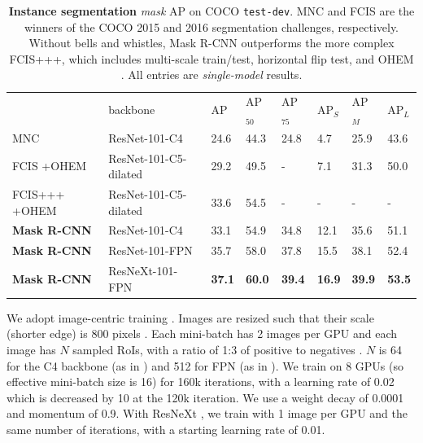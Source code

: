 \documentclass[10pt,twocolumn,letterpaper]{article}
\newcommand{\bd}[1]{\textbf{#1}}
\newcommand{\tablestyle}[2]{\setlength{\tabcolsep}{#1}\renewcommand{\arraystretch}{#2}\centering\footnotesize}
\begin{document}
\begin{table}[t]
\tablestyle{3.5pt}{1.1}
\begin{tabular}{l|l|x{22}x{22}x{22}|x{22}x{22}x{22}}
 & backbone &  AP &  AP$_{50}$ & AP$_{75}$ & AP$_S$ &  AP$_M$ &  AP$_L$\\
\shline
 MNC \cite{Dai2016} & ResNet-101-C4
  & 24.6 & 44.3 & 24.8 & 4.7 & 25.9 & 43.6\\
 FCIS \cite{Li2017} +OHEM & ResNet-101-C5-dilated
  & 29.2 & 49.5 & - & 7.1 & 31.3 & 50.0\\
 FCIS+++ \cite{Li2017} +OHEM & ResNet-101-C5-dilated
  & 33.6 & 54.5 & - & - & - & -\\
\hline
 \bd{Mask R-CNN} & ResNet-101-C4
  & 33.1 & 54.9 & 34.8 & 12.1 & 35.6 & 51.1 \\
 \bd{Mask R-CNN} & ResNet-101-FPN
  & 35.7 & 58.0 & 37.8 & 15.5 & 38.1 & 52.4\\
 \bd{Mask R-CNN} & ResNeXt-101-FPN
  & \bd{37.1} & \bd{60.0} & \bd{39.4} & \bd{16.9} & \bd{39.9} & \bd{53.5}
\end{tabular}\vspace{2mm}
\caption{\textbf{Instance segmentation} \emph{mask} AP on COCO \texttt{test-dev}. MNC \cite{Dai2016} and FCIS \cite{Li2017} are the winners of the COCO 2015 and 2016 segmentation challenges, respectively. Without bells and whistles, Mask R-CNN outperforms the more complex FCIS+++, which includes multi-scale train/test, horizontal flip test, and OHEM \cite{Shrivastava2016}. All entries are \emph{single-model} results.}
\label{tab:final_mask}\vspace{-3mm}
\end{table}

We adopt image-centric training \cite{Girshick2015a}. Images are resized such that their scale (shorter edge) is 800 pixels \cite{Lin2017}. Each mini-batch has 2 images per GPU and each image has $N$ sampled RoIs, with a ratio of 1:3 of positive to negatives \cite{Girshick2015a}. $N$ is 64 for the C4 backbone (as in \cite{Girshick2015a,Ren2015a}) and 512 for FPN (as in \cite{Lin2017}).  We train on 8 GPUs (so effective mini-batch size is 16) for 160k iterations, with a learning rate of 0.02 which is decreased by 10 at the 120k iteration. We use a weight decay of 0.0001 and momentum of 0.9. With ResNeXt \cite{Xie2017}, we train with 1 image per GPU and the same number of iterations, with a starting learning rate of 0.01.
\end{document}
